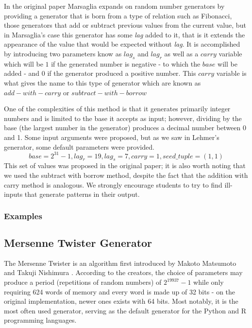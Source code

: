 In the original paper \cite{10.1214/aoap/1177005878} Marsaglia expands on random number generators by providing a generator that is born from a type of relation such as Fibonacci, those generators that add or subtract previous values from the current value, but in Marsaglia's case this generator has some \textit{lag} added to it, that is it extends the appearance of the value that would be expected without \textit{lag}. It is accomplished by introducing two parameters know as $lag_s$ and $lag_r$ as well as a $carry$ variable which will be $1$ if the generated number is negative - to which the $base$ will be added - and $0$ if the generator produced a positive number. This $carry$ variable is what gives the name to this type of generator which are known as $add-with-carry$ or $subtract-with-borrow$

One of the complexities of this method is that it generates primarily integer numbers and is limited to the base it accepts as input; however, dividing by the base (the largest number in the generator) produces a decimal number between 0 and 1. Some input arguments were proposed, but as we saw in Lehmer's generator, some default parameters were provided. 
\[base = 2^{31}-1, lag_r=19, lag_s=7, carry=1, seed\_tuple = (1,1)\]
This set of values was proposed in the original paper; it is also worth noting that we used the subtract with borrow method, despite the fact that the addition with carry method is analogous. We strongly encourage students to try to find ill-inputs that generate patterns in their output.
\subsubsection{Examples}
	


\subsection{Mersenne Twister Generator}
The Mersenne Twister is an algorithm first introduced by Makoto Matsumoto and Takuji Nishimura \cite{matsumoto1998mersenne}. According to the creators, the choice of parameters may produce a period (repetitions of random numbers) of $2^{19937}-1$ while only requiring 624 words of memory and every word is made up of 32 bits - on the original implementation, newer ones exists with 64 bits. Most notably, it is the most often used generator, serving as the default generator for the Python and R programming languages.

